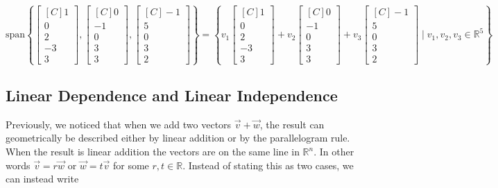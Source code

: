 \begin{example}
\[
\text{span}\left\{
\begin{bmatrix*}[C]1 \\ 0 \\ 2 \\ -3 \\ 3 \end{bmatrix*},
\begin{bmatrix*}[C]0 \\ -1 \\ 0 \\ 3 \\ 3 \end{bmatrix*},
\begin{bmatrix*}[C]-1 \\ 5 \\ 0 \\ 3 \\ 2 \end{bmatrix*}
\right\}
=\left\{
v_ 1\begin{bmatrix*}[C]1 \\ 0 \\ 2 \\ -3 \\ 3 \end{bmatrix*}
+v_2\begin{bmatrix*}[C]0 \\ -1 \\ 0 \\ 3 \\ 3 \end{bmatrix*}
+v_3\begin{bmatrix*}[C]-1 \\ 5 \\ 0 \\ 3 \\ 2 \end{bmatrix*}
\mid 
v_1, v_2, v_3 \in \mathbb{R}^5 
\right\}
\]
\end{example}



\subsection{Linear Dependence and Linear Independence}

Previously, we noticed that when we add two vectors $\vec{v}+\vec{w}$, the result can geometrically be described either by linear addition or by the parallelogram rule. When the result is linear addition the vectors are on the same line in $\mathbb{R}^n$. In other words $\vec{v}=r\vec{w}$ or $\vec{w}=t\vec{v}$ for some $r,t \in \mathbb{R}$. Instead of stating this as two cases, we can instead write 

